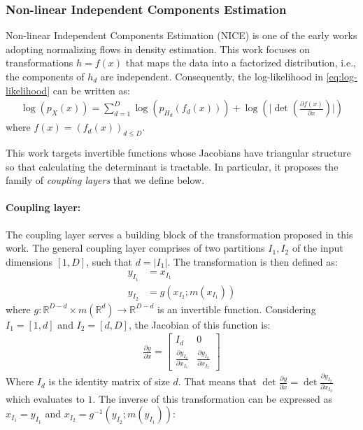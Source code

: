 \documentclass[runningheads]{llncs}
\begin{document}
\subsubsection{Non-linear Independent Components Estimation} \label{sec:nice}

Non-linear Independent Components Estimation (NICE) \cite{dinh2014nice} is one of the early works adopting normalizing flows in density estimation. This work focuses on transformations $h=f(x)$ that maps the data into a factorized distribution, i.e., the components of $h_d$ are independent. Consequently, the log-likelihood in \cref{eq:log-likelihood} can be written as:
\begin{align}
\log(p_X(x)) = \sum_{d=1}^{D}{\log(p_{H_{d}}(f_{d}(x)))} + \log(\lvert \det(\frac{\partial f(x)}{\partial x}) \rvert)
\end{align}
where $f(x) = (f_{d}(x))_{d \leq D}$.

This work targets invertible functions whose Jacobians have triangular structure so that calculating the determinant is tractable. In particular, it proposes the family of \textit{coupling layers} that we define below.

\paragraph{Coupling layer:} The coupling layer serves a building block of the transformation proposed in this work. The general coupling layer comprises of two partitions $I_{1}, I_{2}$ of the input dimensions  $\left[ 1, D \right]$, such that $d = \lvert I_{1} \rvert$. The transformation is then defined as:
\begin{align}
y_{I_{1}} &= x_{I_{1}} \\
y_{I_{2}} &= g(x_{I_{2}} ; m(x_{I_{1}}))
\end{align}
where
$g: \mathbb{R}^{D-d} \times m(\mathbb{R}^{d}) \rightarrow \mathbb{R}^{D-d}$ is an invertible function. Considering 
$I_{1} = \left[ 1, d \right]$ and $I_{2} = \left[ d, D \right]$,
the Jacobian of this function is:
\begin{align*}
\frac{\partial y}{\partial x} =
\begin{bmatrix}
I_{d} & 0 \\
\frac{\partial y_{I_{2}}}{\partial x_{I_{1}}} & \frac{\partial y_{I_{2}}}{\partial x_{I_{2}}} 
\end{bmatrix}
\end{align*}
Where $I_{d}$ is the identity matrix of size $d$. That means that
$\det \frac{\partial y}{\partial x} = \det \frac{\partial y_{I_{2}}}{\partial x_{I_{2}}}$ which evaluates to $1$. 
The inverse of this transformation can be expressed as $x_{I_{1}} = y_{I_{1}}$ and $x_{I_{2}} = g^{-1}(y_{I_{2}} ; m(y_{I_{1}}))$:
\end{document}

